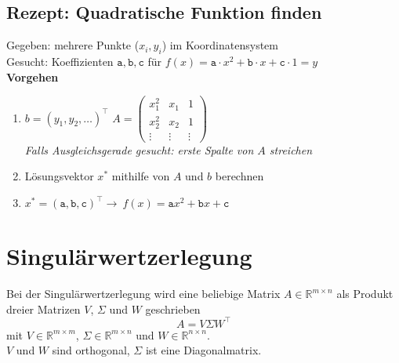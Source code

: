 \documentclass[german, 6pt]{latex4ei/latex4ei_sheet}
\begin{document}
\subsection{Rezept: Quadratische Funktion finden}
Gegeben: mehrere Punkte ($x_i, y_i$) im Koordinatensystem\\
Gesucht: Koeffizienten $\mathtt{a}, \mathtt{b}, \mathtt{c}$ für $f(x)=\mathtt{a}\cdot x^2+\mathtt{b}\cdot x+\mathtt{c}\cdot 1=y$\\
\textbf{Vorgehen}
\begin{enumerate}
\item $b = (y_1, y_2, \dots)^\top$ \qquad $A = \begin{pmatrix}
x_1^2 & x_1 & 1 \\[3pt]
x_2^2 & x_2 & 1 \\[3pt]
\vdots & \vdots & \vdots
\end{pmatrix}$ \\
\textit{Falls Ausgleichsgerade gesucht: erste Spalte von $A$ streichen}
\item Lösungsvektor $x^*$ mithilfe von $A$ und $b$ berechnen
\item $x^*=(\mathtt{a}, \mathtt{b}, \mathtt{c})^\top \rightarrow \ f(x)=\mathtt{a}x^2+\mathtt{b}x+\mathtt{c}$
\end{enumerate}
\section{Singulärwertzerlegung}
Bei der Singulärwertzerlegung wird eine beliebige Matrix $A\in \mathbb{R}^{m\times n}$ als Produkt dreier Matrizen $V$, $\Sigma$ und $W$ geschrieben
\begin{equation*}
A=V\Sigma W^\top
\end{equation*}
mit $V\in \mathbb{R}^{m\times m}$, $\Sigma\in \mathbb{R}^{m\times n}$ und $W\in \mathbb{R}^{n\times n}$.\\
$V$ und $W$ sind orthogonal, $\Sigma$ ist eine Diagonalmatrix.
\end{document}
